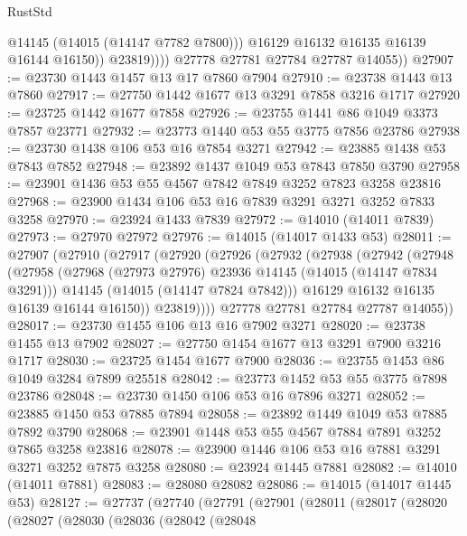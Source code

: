 \begin{lexlean}{RustStd}
\begin{coremodule}
                      @14145
                      (@14015 (@14147 @7782 @7800)))
                    @16129
                    @16132
                    @16135
                    @16139
                    @16144
                    @16150))
                @23819))))
        @27778
        @27781
        @27784
        @27787
        @14055))
@27907 := @23730 @1443 @1457 @13 @17 @7860 @7904
@27910 := @23738 @1443 @13 @7860
@27917 := @27750 @1442 @1677 @13 @3291 @7858 @3216 @1717
@27920 := @23725 @1442 @1677 @7858
@27926 := @23755 @1441 @86 @1049 @3373 @7857 @23771
@27932 := @23773 @1440 @53 @55 @3775 @7856 @23786
@27938 := @23730 @1438 @106 @53 @16 @7854 @3271
@27942 := @23885 @1438 @53 @7843 @7852
@27948 := @23892 @1437 @1049 @53 @7843 @7850 @3790
@27958 := @23901 @1436 @53 @55 @4567 @7842 @7849 @3252 @7823 @3258 @23816
@27968 := @23900 @1434 @106 @53 @16 @7839 @3291 @3271 @3252 @7833 @3258
@27970 := @23924 @1433 @7839
@27972 := @14010 (@14011 @7839)
@27973 := @27970 @27972
@27976 := @14015 (@14017 @1433 @53)
@28011 := @27907
    (@27910
      (@27917
        (@27920
          (@27926
            (@27932
              (@27938
                (@27942
                  (@27948
                    (@27958
                      (@27968 (@27973 @27976) @23936 @14145 (@14015 (@14147 @7834 @3291)))
                      @14145
                      (@14015 (@14147 @7824 @7842)))
                    @16129
                    @16132
                    @16135
                    @16139
                    @16144
                    @16150))
                @23819))))
        @27778
        @27781
        @27784
        @27787
        @14055))
@28017 := @23730 @1455 @106 @13 @16 @7902 @3271
@28020 := @23738 @1455 @13 @7902
@28027 := @27750 @1454 @1677 @13 @3291 @7900 @3216 @1717
@28030 := @23725 @1454 @1677 @7900
@28036 := @23755 @1453 @86 @1049 @3284 @7899 @25518
@28042 := @23773 @1452 @53 @55 @3775 @7898 @23786
@28048 := @23730 @1450 @106 @53 @16 @7896 @3271
@28052 := @23885 @1450 @53 @7885 @7894
@28058 := @23892 @1449 @1049 @53 @7885 @7892 @3790
@28068 := @23901 @1448 @53 @55 @4567 @7884 @7891 @3252 @7865 @3258 @23816
@28078 := @23900 @1446 @106 @53 @16 @7881 @3291 @3271 @3252 @7875 @3258
@28080 := @23924 @1445 @7881
@28082 := @14010 (@14011 @7881)
@28083 := @28080 @28082
@28086 := @14015 (@14017 @1445 @53)
@28127 := @27737
    (@27740
      (@27791
        (@27901
          (@28011
            (@28017
              (@28020
                (@28027
                  (@28030
                    (@28036
                      (@28042
                        (@28048

\end{coremodule}
\end{lexlean}
